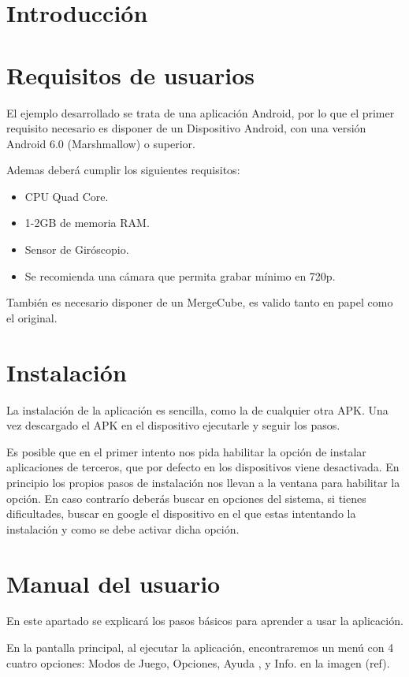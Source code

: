 
\section{Introducción}

\section{Requisitos de usuarios}
 El ejemplo desarrollado se trata de una aplicación Android, por lo que el primer requisito necesario es disponer de un Dispositivo Android, con una versión Android 6.0 (Marshmallow) o superior.
  
 Ademas deberá cumplir los siguientes requisitos\cite{vuforia_devices}:
 \begin{itemize}
 	\item CPU Quad Core.
 	\item 1-2GB de memoria RAM.
 	\item Sensor de Giróscopio.
 	\item Se recomienda una cámara que permita grabar mínimo en 720p.  
 \end{itemize}
También es necesario disponer de un MergeCube, es valido tanto en papel como el original. 
\section{Instalación}

La instalación de la aplicación es sencilla, como la de cualquier otra APK. Una vez descargado el APK en el dispositivo ejecutarle y seguir los pasos.

Es posible que en el primer intento nos pida habilitar la opción de instalar aplicaciones de terceros, que por defecto en los dispositivos viene desactivada. En principio los propios pasos de instalación nos llevan a la ventana para habilitar la opción. En caso contrarío deberás buscar en opciones del sistema, si tienes dificultades, buscar en google el dispositivo en el que estas intentando la instalación y como se debe activar dicha opción.
\section{Manual del usuario}

En este apartado se explicará los pasos básicos para aprender a usar la aplicación.

En la pantalla principal, al ejecutar la aplicación, encontraremos un menú con 4 cuatro opciones: Modos de Juego, Opciones, Ayuda , y Info. en la imagen (ref).

